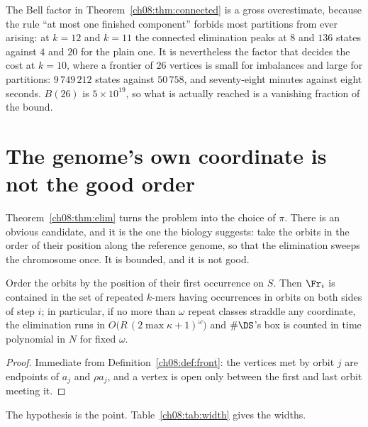 \begin{remark}\label{ch08:rem:bell}
The Bell factor in Theorem~\ref{ch08:thm:connected} is a gross overestimate, because the rule
``at most one finished component'' forbids most partitions from ever arising: at $k=12$ and
$k=11$ the connected elimination peaks at $8$ and $136$ states against $4$ and $20$ for the
plain one. It is nevertheless the factor that decides the cost at $k=10$, where a frontier of
$26$ vertices is small for imbalances and large for partitions: $9\,749\,212$ states against
$50\,758$, and seventy-eight minutes against eight seconds. $B(26)$ is $5\times10^{19}$, so
what is actually reached is a vanishing fraction of the bound.
\end{remark}

\section{The genome's own coordinate is not the good order}\label{ch08:sec:width}

Theorem~\ref{ch08:thm:elim} turns the problem into the choice of $\pi$. There is an obvious
candidate, and it is the one the biology suggests: take the orbits in the order of their
position along the reference genome, so that the elimination sweeps the chromosome once. It
is bounded, and it is not good.

\begin{proposition}\label{ch08:prop:coord}
Order the orbits by the position of their first occurrence on $S$. Then $\Fr_i$ is contained
in the set of repeated $k$-mers having occurrences in orbits on both sides of step $i$; in
particular, if no more than $\omega$ repeat classes straddle any coordinate, the elimination
runs in $O\big(R\,(2\max\kappa+1)^{\omega}\big)$ and $\#\DS$'s box is counted in time
polynomial in $N$ for fixed $\omega$.
\end{proposition}

\begin{proof}
Immediate from Definition~\ref{ch08:def:front}: the vertices met by orbit $j$ are endpoints of
$a_j$ and $\rho a_j$, and a vertex is open only between the first and last orbit meeting it.
\end{proof}

The hypothesis is the point. Table~\ref{ch08:tab:width} gives the widths.

